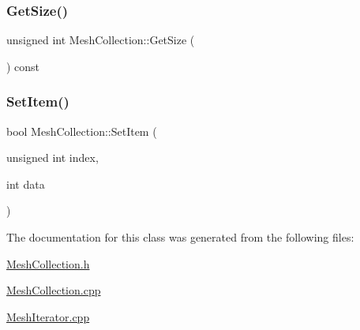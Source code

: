 \mbox{\label{class_mesh_collection_a8bf6eaca8ec989b7a87919b5fa38fa5c}} 
\subsubsection{\texorpdfstring{GetSize()}{GetSize()}}
{\footnotesize\ttfamily unsigned int Mesh\+Collection\+::\+Get\+Size (\begin{DoxyParamCaption}{ }\end{DoxyParamCaption}) const}

\mbox{\label{class_mesh_collection_a1560794edf29c2113e237946ebfa9c51}} 
\subsubsection{\texorpdfstring{SetItem()}{SetItem()}}
{\footnotesize\ttfamily bool Mesh\+Collection\+::\+Set\+Item (\begin{DoxyParamCaption}\item[{unsigned int}]{index,  }\item[{int}]{data }\end{DoxyParamCaption})}



The documentation for this class was generated from the following files\+:\begin{DoxyCompactItemize}
\item 
\mbox{\hyperlink{_mesh_collection_8h}{Mesh\+Collection.\+h}}\item 
\mbox{\hyperlink{_mesh_collection_8cpp}{Mesh\+Collection.\+cpp}}\item 
\mbox{\hyperlink{_mesh_iterator_8cpp}{Mesh\+Iterator.\+cpp}}\end{DoxyCompactItemize}

